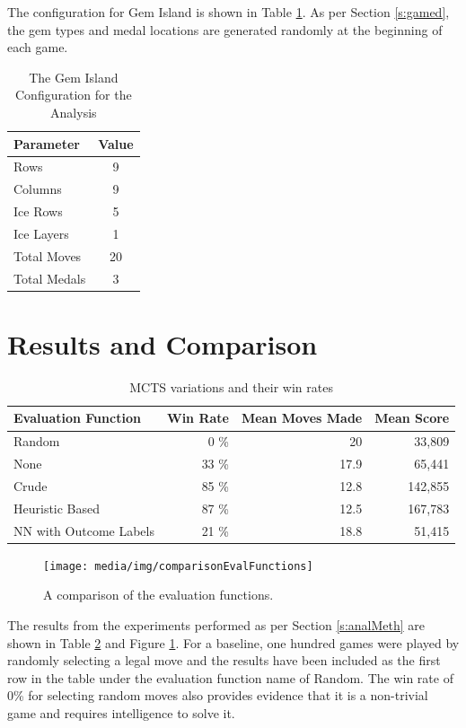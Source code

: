 \documentclass{bhamthesis}
\theoremstyle{definition}
\begin{document}
The configuration for Gem Island is shown in Table \ref{t:analysisConfig}. As per Section \ref{s:gamed}, the gem types and medal locations are generated randomly at the beginning of each game. 

\begin{table}[]
	\centering
	\caption{The Gem Island Configuration for the Analysis}
	\label{t:analysisConfig}
	\begin{tabular}{lc}
		\hline
		Parameter    & Value \\ \hline
		Rows         & 9     \\
		Columns      & 9     \\
		Ice Rows      & 5     \\
		Ice Layers   & 1     \\
		Total Moves  & 20    \\
		Total Medals & 3    
	\end{tabular}
\end{table}


\section{Results and Comparison}\label{s:resultsC}

\begin{table}[]
	\centering
	\caption{MCTS variations and their win rates}
	\label{t:MCTSWinRates}
	\begin{tabular}{lrrr}
		\hline
		Evaluation Function    & Win Rate & Mean Moves Made & Mean Score \\ \hline
		Random                 & 0 \%     & 20              & 33,809     \\
		None                   & 33 \%    & 17.9            & 65,441     \\
		Crude                  & 85 \%    & 12.8            & 142,855    \\
		Heuristic Based        & 87 \%    & 12.5            & 167,783    \\
		NN with Outcome Labels & 21 \%    & 18.8            & 51,415    
	\end{tabular}
\end{table}

\begin{figure}
	\centering
	\texttt{[image: media/img/comparisonEvalFunctions]}
	\caption{A comparison of the evaluation functions.}\label{f:boxComparison}
\end{figure}

The results from the experiments performed as per Section \ref{s:analMeth} are shown in Table \ref{t:MCTSWinRates} and Figure \ref{f:boxComparison}. For a baseline, one hundred games were played by randomly selecting a legal move and the results have been included as the first row in the table under the evaluation function name of Random. The win rate of 0\% for selecting random moves also provides evidence that it is a non-trivial game and requires intelligence to solve it.
\end{document}
